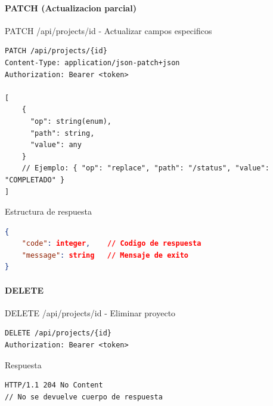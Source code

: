 \documentclass[11pt,a4paper]{article}
\begin{document}
\paragraph{PATCH (Actualizacion parcial)}
\begin{center}
	\begin{minipage}{\textwidth}
		\begin{codebox}{PATCH /api/projects/{id} - Actualizar campos especificos}
			\begin{lstlisting}[language=HTTP]
PATCH /api/projects/{id}
Content-Type: application/json-patch+json
Authorization: Bearer <token>

[
    {
      "op": string(enum),
      "path": string,
      "value": any
    }
    // Ejemplo: { "op": "replace", "path": "/status", "value": "COMPLETADO" }
]
\end{lstlisting}
		\end{codebox}
	\end{minipage}
\end{center}

\begin{center}
	\begin{minipage}{\textwidth}
		\begin{codebox}{Estructura de respuesta}
			\begin{lstlisting}[language=json]
{
    "code": integer,    // Codigo de respuesta
    "message": string   // Mensaje de exito
}
\end{lstlisting}
		\end{codebox}
	\end{minipage}
\end{center}

\paragraph{DELETE}
\begin{center}
	\begin{minipage}{\textwidth}
		\begin{codebox}{DELETE /api/projects/{id} - Eliminar proyecto}
			\begin{lstlisting}[language=HTTP]
DELETE /api/projects/{id}
Authorization: Bearer <token>
\end{lstlisting}
		\end{codebox}
	\end{minipage}
\end{center}

\begin{center}
	\begin{minipage}{\textwidth}
		\begin{codebox}{Respuesta}
			\begin{lstlisting}[language=HTTP]
HTTP/1.1 204 No Content
// No se devuelve cuerpo de respuesta
\end{lstlisting}
		\end{codebox}
	\end{minipage}
\end{center}
\end{document}
